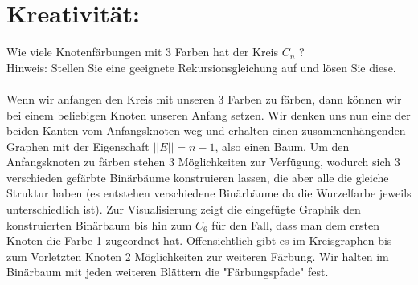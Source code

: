     \section*{Kreativität:} Wie viele Knotenfärbungen mit 3 Farben hat der Kreis $C_n$ ?\\
    Hinweis: Stellen Sie eine geeignete Rekursionsgleichung auf und lösen Sie diese.\\
    \\
    Wenn wir anfangen den Kreis mit unseren 3 Farben zu färben, dann können wir bei einem beliebigen 
    Knoten unseren Anfang setzen. Wir denken uns nun eine der beiden Kanten vom Anfangsknoten weg und
    erhalten einen zusammenhängenden Graphen mit der Eigenschaft $||E|| = n-1$, also einen Baum. Um 
    den Anfangsknoten zu färben stehen 3 Möglichkeiten zur Verfügung, wodurch sich 3 verschieden gefärbte 
    Binärbäume konstruieren lassen, die aber alle die gleiche Struktur haben (es entstehen verschiedene 
    Binärbäume da die Wurzelfarbe jeweils unterschiedlich ist). Zur Visualisierung zeigt die eingefügte 
    Graphik den konstruierten Binärbaum bis hin zum $C_6$ für den Fall, dass man dem ersten Knoten die 
    Farbe 1 zugeordnet hat. Offensichtlich gibt es im Kreisgraphen bis zum Vorletzten Knoten 2 Möglichkeiten 
    zur weiteren Färbung. Wir halten im Binärbaum mit jeden weiteren Blättern die "Färbungspfade" fest. 
